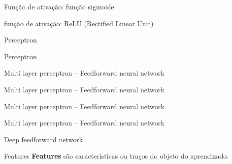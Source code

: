 \documentclass[10pt]{beamer}
\begin{document}
\begin{frame}{Função de ativação: função sigmoide}

\end{frame}

\begin{frame}{função de ativação: ReLU (Rectified Linear Unit)}

\end{frame}

\begin{frame}[fragile]{Perceptron}

\end{frame}

\begin{frame}[fragile]{Perceptron}

\end{frame}

\begin{frame}[fragile]{Multi layer perceptron -- Feedforward neural network}

\end{frame}

\begin{frame}[fragile]{Multi layer perceptron -- Feedforward neural network}

\end{frame}

\begin{frame}[fragile]{Multi layer perceptron -- Feedforward neural network}

\end{frame}

\begin{frame}[fragile]{Multi layer perceptron -- Feedforward neural network}

\end{frame}

\begin{frame}[fragile]{Deep feedforward network}

\end{frame}


\begin{frame}[fragile]{Features}
\textbf{\alert{Features}} são características ou traços do objeto do aprendizado.
\\
\\
\end{frame}
\end{document}
